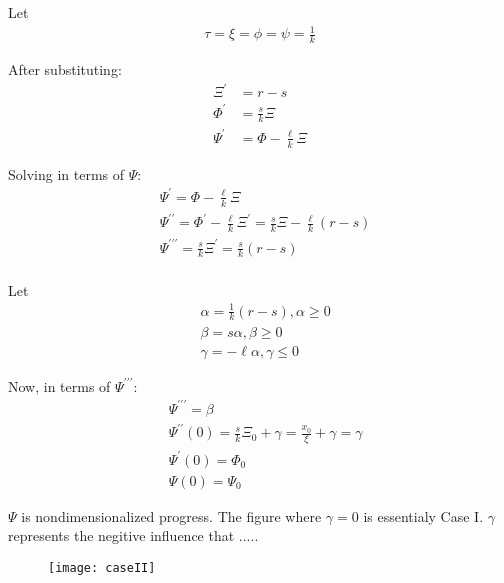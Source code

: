 \documentclass{article}
\newenvironment{atomize}
    {\begin{list} {} {
            \setlength\itemindent{0pt}
            \setlength\leftmargin{10pt}
            \setlength\labelwidth{0pt}
    }}
    {\end{list}}
\begin{document}
\begin{atomize}
\begin{atomize}
        \item Let
          \begin{align*}
            \tau = \xi = \phi = \psi = \frac{1}{k}
          \end{align*}
          
        \item After substituting:
          \begin{align*}
            \Xi^{\prime} &= r - s \\[6pt]
            \Phi^{\prime} &= \frac{s}{k}\Xi \\[6pt]
            \Psi^{\prime} &= \Phi - \frac{\ell}{k}\Xi
          \end{align*}

        \item Solving in terms of $\Psi$:
          \begin{align*}
            &\Psi^{\prime} = \Phi - \frac{\ell}{k}\Xi \\[6pt]
            &\Psi^{\prime\prime} = \Phi^{\prime} - \frac{\ell}{k}\Xi^{\prime} 
            = \frac{s}{k}\Xi - \frac{\ell}{k}(r - s) \\[6pt]
            &\Psi^{\prime\prime\prime} = \frac{s}{k}\Xi^{\prime} = 
            \frac{s}{k}(r - s) \\[6pt]
          \end{align*}

        \item Let
          \begin{align*}
            &\alpha = \frac{1}{k}(r-s), \alpha \geq 0 \\[6pt]
            &\beta = s\alpha, \beta \geq 0 \\[6pt]
            &\gamma = -\ell\alpha, \gamma \leq 0
          \end{align*}

        \item Now, in terms of $\Psi^{\prime\prime\prime}$:
          \begin{align*}
            &\Psi^{\prime\prime\prime} = \beta \\[6pt]
            &\Psi^{\prime\prime}(0) = \frac{s}{k}\Xi_{0} + \gamma = 
              \frac{x_{0}}{\xi} + \gamma = \gamma \\[6pt]
            &\Psi^{\prime}(0) = \Phi_{0} \\[6pt]
            &\Psi(0) = \Psi_{0}
          \end{align*}
        \item $\Psi$ is nondimensionalized progress. The figure where 
        $\gamma = 0$ is essentialy Case I. $\gamma$ represents the negitive 
        influence that .....
        \item 
          \begin{figure}[H]
            \centering
            \texttt{[image: caseII]}
          \end{figure}
      \end{atomize}


\end{atomize}
\end{document}

